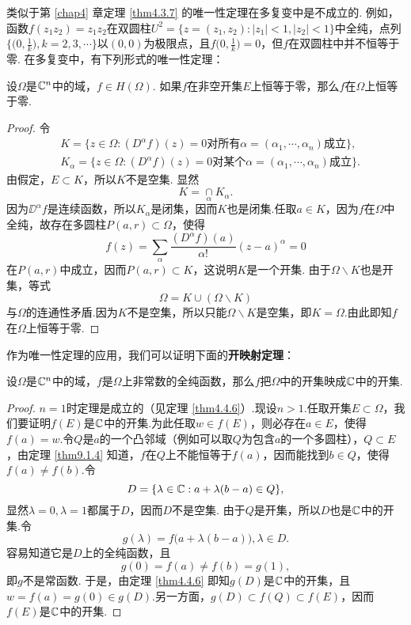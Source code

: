 类似于第 \ref{chap4} 章定理 \ref{thm4.3.7} 的唯一性定理在多复变中是不成立的. 例如，函数$f(z_1z_2)=z_1z_2$在双圆柱$U^2=\{z=(z_1,z_2):|z_1|<1,|z_2|<1\}$中全纯，点列$\bigg\{\bigg(0,\frac1k\bigg),k=2,3,\cdots\bigg\}$以$(0,0)$为极限点，且$f\bigg(0,\frac1k\bigg)=0$，但$f$在双圆柱中并不恒等于零. 在多复变中，有下列形式的唯一性定理：
\begin{theorem}\label{thm9.1.4}
设$\Omega$是$\mathbb C^n$中的域，$f\in H(\Omega)$. 如果$f$在非空开集$E$上恒等于零，那么$f$在$\Omega$上恒等于零.
\end{theorem}
\begin{proof}
令
\begin{align*}
&K=\{z\in\Omega:(D^\alpha f)(z)=0\mbox{对所有$\alpha=(\alpha_1,\cdots,\alpha_n)$成立}\},\\
&K_\alpha=\{z\in\Omega:(D^\alpha f)(z)=0\mbox{对某个$\alpha=(\alpha_1,\cdots,\alpha_n)$成立}\}.
\end{align*}
由假定，$E\subset K$，所以$K$不是空集. 显然
\[K=\operatorname*{\cap}_\alpha K_\alpha.\]
因为$\DD^\alpha f$是连续函数，所以$K_\alpha$是闭集，因而$K$也是闭集.任取$a\in K$，因为$f$在$\Omega$中全纯，故存在多圆柱$P(a,r)\subset \Omega$，使得
\[f(z)=\sum_\alpha\frac{(D^\alpha f)(a)}{\alpha!}(z-a)^\alpha=0\]
在$P(a,r)$中成立，因而$P(a,r)\subset K$，这说明$K$是一个开集. 由于$\Omega\backslash K$也是开集，等式
\[\Omega=K\cup(\Omega\backslash K)\]
与$\Omega$的连通性矛盾.因为$K$不是空集，所以只能$\Omega\backslash K$是空集，即$K=\Omega$.由此即知$f$在$\Omega$上恒等于零.
\end{proof}

作为唯一性定理的应用，我们可以证明下面的\textbf{开映射定理}：
\begin{theorem}\label{thm9.1.5}
设$\Omega$是$\mathbb C^n$中的域，$f$是$\Omega$上非常数的全纯函数，那么$f$把$\Omega$中的开集映成$\mathbb C$中的开集.
\end{theorem}
\begin{proof}
$n=1$时定理是成立的（见定理 \ref{thm4.4.6}）.现设$n>1$.任取开集$E\subset\Omega$，我们要证明$f(E)$是$\mathbb C$中的开集.为此任取$w\in f(E)$，则必存在$a\in E$，使得$f(a)=w$.令$Q$是$a$的一个凸邻域（例如可以取$Q$为包含$a$的一个多圆柱），$Q\subset E$，由定理 \ref{thm9.1.4} 知道，$f$在$Q$上不能恒等于$f(a)$，因而能找到$b\in Q$，使得$f(a)\ne f(b)$.令
\[D=\{\lambda\in\mathbb C:a+\lambda(b-a)\in Q\},\]
显然$\lambda=0,\lambda=1$都属于$D$，因而$D$不是空集. 由于$Q$是开集，所以$D$也是$\mathbb C$中的开集.令
\[g(\lambda)=f\big(a+\lambda(b-a)\big),\lambda\in D.\]
容易知道它是$D$上的全纯函数，且
\[g(0)=f(a)\ne f(b)=g(1),\]
即$g$不是常函数. 于是，由定理 \ref{thm4.4.6} 即知$g(D)$是$\mathbb C$中的开集，且$w=f(a)=g(0)\in g(D)$.另一方面，$g(D)\subset f(Q)\subset f(E)$，因而$f(E)$是$\mathbb C$中的开集.
\end{proof}

